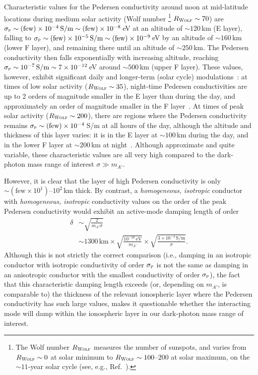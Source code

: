 \documentclass[amsmath,amssymb,aps,10pt,prd,letterpaper,nofootinbib,balancelastpage,notitlepage,superscriptaddress,twocolumn,floatfix]{revtex4-2}
\newcommand{\citeR}[2][]{Ref{#1}.~\cite{#2}}		%
\begin{document}
Characteristic values for the Pedersen conductivity around noon at mid-latitude locations during medium solar activity 
(Wolf number%
\footnote{\label{ftnt:WolfNumber}%
    The Wolf number $R_{\textsc{Wolf}}$ measures the number of sunspots, and varies from $R_{\textsc{Wolf}}\sim 0$ at solar minimum to $R_{\textsc{Wolf}} \sim 100$--$200$ at solar maximum, on the $\sim 11$-year solar cycle (see, e.g., \citeR{Clette_2014}).
} %
$R_{\textsc{Wolf}} \sim 70$) 
are $\sigma_{\textsc{p}} \sim (\text{few})\times 10^{-4}\,\text{S/m}\sim (\text{few}) \times 10^{-8}\,$eV at an altitude of $\sim 120\,$km (E layer), falling to $\sigma_{\textsc{p}} \sim (\text{few})\times 10^{-5}\,\text{S/m} \sim (\text{few}) \times 10^{-9}\,$eV by an altitude of $\sim 160\,$km (lower F layer), and remaining there until an altitude of $\sim 250\,$km.
The Pedersen conductivity then falls exponentially with increasing altitude, reaching $\sigma_{\textsc{p}} \sim 10^{-7}\,\text{S/m} \sim 7\times 10^{-12}\,$eV around $\sim 500\,$km (upper F layer). 
These values, however, exhibit significant daily and longer-term (solar cycle) modulations~\cite{Takeda:1985hcf}: at times of low solar activity ($R_{\textsc{Wolf}}\sim 35$), night-time Pedersen conductivities are up to 2 orders of magnitude smaller in the E layer than during the day, and approximately an order of magnitude smaller in the F layer~\cite{Takeda:1985hcf}.
At times of peak solar activity ($R_{\textsc{Wolf}}\sim 200$), there are regions where the Pedersen conductivity remains $\sigma_{\textsc{p}} \sim (\text{few})\times 10^{-4}\,$S/m at all hours of the day, although the altitude and thickness of this layer varies: it is in the E layer at $\sim 100\,$km during the day, and in the lower F layer at $\sim 200\,$km at night~\cite{Takeda:1985hcf}.
Although approximate and quite variable, these characteristic values are all very high compared to the dark-photon mass range of interest $\sigma \gg m_{A'}$.

However, it is clear that the layer of high Pedersen conductivity is only $\sim (\text{few} \times 10^1)$--$10^2$\,km thick.
By contrast, a \emph{homogeneous, isotropic} conductor with \emph{homogeneous, isotropic} conductivity values on the order of the peak Pedersen conductivity would exhibit an active-mode damping length of order 
\begin{align}
    \delta &\sim \sqrt{\frac{2}{m_{A'}\sigma}} \nonumber \\
    &\sim 1300\,\text{km}\times \sqrt{\frac{10^{-18}\,\text{eV}}{m_{A'}}} \times \sqrt{\frac{3\times10^{-4}\,\text{S/m}}{\sigma}}.
\end{align}
Although this is not strictly the correct comparison (i.e., damping in an isotropic conductor with isotropic conductivity of order $\sigma_{\textsc{p}}$ is not the same as damping in an anisotropic conductor with the smallest conductivity of order $\sigma_{\textsc{p}}$), the fact that this characteristic damping length exceeds (or, depending on $m_{A'}$, is comparable to) the thickness of the relevant ionospheric layer where the Pedersen conductivity has such large values, makes it questionable whether the interacting mode will damp within the ionospheric layer in our dark-photon mass range of interest. 
\end{document}
